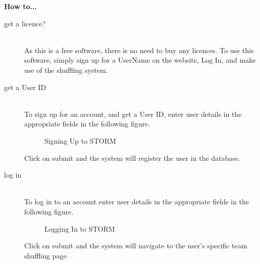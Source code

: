 {\Large \textbf{How to...} \par}

\begin{description}
 	\item[get a licence?] \hfill \\
 		As this is a free software, there is no need to buy any licences. To use this software, simply 
		sign up for a UserName on the website, Log In, and make use of the shuffling system.
 	\item[get a User ID] \hfill \\
		To sign up for an account, and get a User ID, enter user details in the appropriate fields in the 		following figure.\par
		 \begin{figure}[h!] 
		 \centering {}
		 \caption{Signing Up to STORM}
		 \end{figure}
   		Click on submit and the system will register the user in the database.
	\item[log in] \hfill \\
 		To log in to an account enter user details in the appropriate fields in the following figure.\par
   		\begin{figure}[h!] 
		\centering {}
		\caption{Logging In to STORM}
		\end{figure}
   		Click on submit and the system will navigate to the user's specific team shuffling page.

\end{description}
